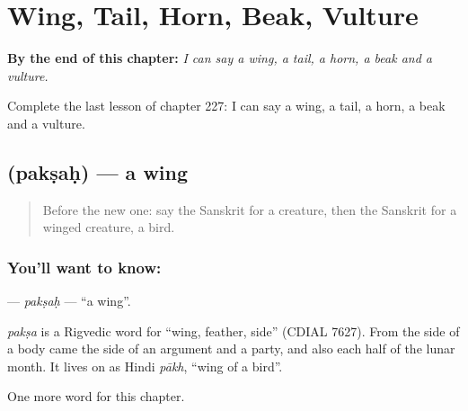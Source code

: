 
\chapter{Wing, Tail, Horn, Beak, Vulture}
\label{ch:sa-wing-tail-horn-beak-vulture}

\begin{chapteropening}
\textbf{By the end of this chapter:} \emph{I can say a wing, a tail, a horn, a beak and a vulture.}

Complete the last lesson of chapter 227: I can say a wing, a tail, a horn, a beak and a vulture.
\end{chapteropening}

\section[\texorpdfstring{\sk{पक्षः} (pakṣaḥ)}{पक्षः (pakṣaḥ)}]{ (pakṣaḥ) — a wing}

\label{lesson:SA-C227-paksah}



\begin{quote}
Before the new one: say the Sanskrit for a creature, then the Sanskrit for a winged creature, a bird.
\end{quote}

\subsection*{You'll want to know: }
\textbf{} — \emph{pakṣaḥ} — \textquotedblleft{}a wing\textquotedblright{}.

\begin{cousinweb}
\emph{pakṣa} is a Rigvedic word for \textquotedblleft{}wing, feather, side\textquotedblright{} (CDIAL 7627). From the side of a body came the side of an argument and a party, and also each half of the lunar month. It lives on as Hindi \emph{pākh}, \textquotedblleft{}wing of a bird\textquotedblright{}.
\end{cousinweb}

\begin{grammarlens}[title={What you've built}]
One more word for this chapter.
\end{grammarlens}

